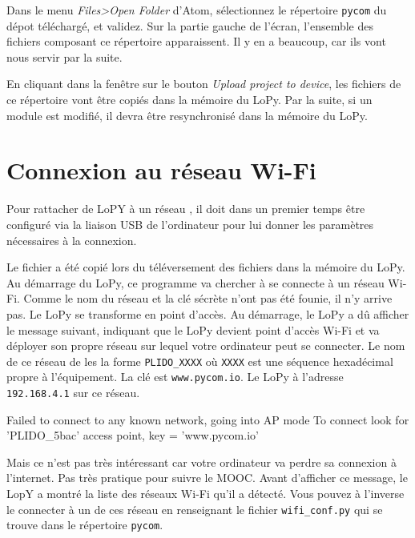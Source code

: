 Dans le menu \textit{Files>Open Folder} d’Atom, sélectionnez le répertoire \texttt{pycom} du dépot téléchargé, et validez. Sur la partie gauche de l’écran, l’ensemble des fichiers composant ce répertoire apparaissent. Il y en a beaucoup, car ils vont nous servir par la suite.

     \vspace{1em}

En cliquant dans la fenêtre \textit{} sur le bouton \textit{Upload project to device}, les fichiers de ce répertoire vont être copiés dans la mémoire du LoPy. 
Par la suite, si un module est modifié, il devra être resynchronisé dans la mémoire du LoPy.

\section{Connexion au réseau Wi-Fi}

\begin{figure}
\end{figure}


Pour rattacher de LoPY à un réseau , il doit dans un premier temps être configuré via la liaison USB de l'ordinateur pour lui donner les paramètres nécessaires à la connexion. 


Le fichier \texttt{} a été copié lors du téléversement des fichiers dans la mémoire du LoPy. Au démarrage du LoPy, ce programme va chercher à se connecte à un réseau Wi-Fi. Comme le nom du réseau et la clé sécrète n'ont pas été founie, il n’y arrive pas. Le LoPy se transforme  en point d’accès. Au démarrage, le LoPy a dû afficher le message suivant, indiquant que le LoPy devient point d'accès Wi-Fi et va déployer son propre réseau sur lequel votre ordinateur peut se connecter. Le nom de ce réseau de les la forme \texttt{PLIDO\_XXXX} où \texttt{XXXX} est une séquence hexadécimal propre à l'équipement. La clé est \texttt{www.pycom.io}. Le LoPy à l'adresse \texttt{192.168.4.1} sur ce réseau.  

\begin{termc}[backgroundcolor=\color{gray!10},  basicstyle=\ttfamily\small, escapechar=@]
Failed to connect to any known network, going into AP mode
To connect look for 'PLIDO_5bac' access point, key = 'www.pycom.io'
\end{termc}

Mais ce n'est pas très intéressant car votre ordinateur va perdre sa connexion à l'internet. Pas très pratique pour suivre le MOOC. Avant d'afficher ce message, le LopY a montré la liste des réseaux Wi-Fi qu'il a détecté. Vous pouvez à l'inverse le connecter à un de ces réseau en renseignant le fichier \texttt{wifi\_conf.py} qui se trouve dans le répertoire \texttt{pycom}.


